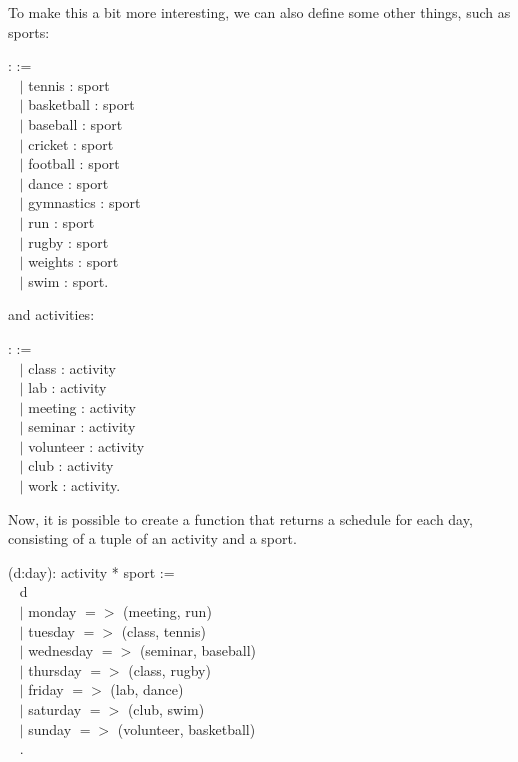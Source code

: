\noindent
To make this a bit more interesting, we can also define some other things, such as sports:

\begin{code}
\Inductive {}: \Type :=		\\ \-\ \quad
  $\mid$ tennis : sport			\\ \-\ \quad
  $\mid$ basketball : sport			\\ \-\ \quad
  $\mid$ baseball : sport 			\\ \-\ \quad
  $\mid$ cricket : sport			\\ \-\ \quad
  $\mid$ football : sport			\\ \-\ \quad
  $\mid$ dance : sport			\\ \-\ \quad
  $\mid$ gymnastics : sport		\\ \-\ \quad
  $\mid$ run : sport				\\ \-\ \quad
  $\mid$ rugby : sport			\\ \-\ \quad
  $\mid$ weights : sport			\\ \-\ \quad
  $\mid$ swim : sport.
\end{code}

and activities: 

\begin{code}
\Inductive {}: \Type :=	\\ \-\ \quad
  $\mid$ class : activity			\\ \-\ \quad
  $\mid$ lab : activity				\\ \-\ \quad
  $\mid$ meeting : activity			\\ \-\ \quad
  $\mid$ seminar : activity			\\ \-\ \quad
  $\mid$ volunteer : activity		\\ \-\ \quad
  $\mid$ club : activity			\\ \-\ \quad
  $\mid$ work : activity.	
\end{code}

\noindent
Now, it is possible to create a function that returns a schedule for each day, 
consisting of a tuple of an activity and a sport. 

\begin{code}
\Definition {} (d:day): activity * sport :=		\\ \-\ \quad
  \match d \with										\\ \-\ \qquad
   $\mid$ monday $=>$ (meeting, run)					\\ \-\ \qquad
   $\mid$ tuesday $=>$ (class, tennis)					\\ \-\ \qquad
   $\mid$ wednesday $=>$ (seminar, baseball)				\\ \-\ \qquad
   $\mid$ thursday $=>$ (class, rugby)					\\ \-\ \qquad
   $\mid$ friday $=>$ (lab, dance)						\\ \-\ \qquad
   $\mid$ saturday $=>$ (club, swim)						\\ \-\ \qquad
   $\mid$ sunday $=>$ (volunteer, basketball)				\\ \-\ \quad
  \End.	
\end{code}

